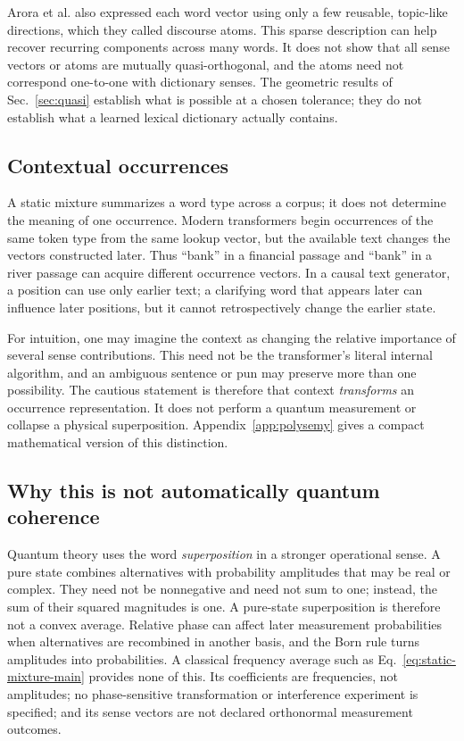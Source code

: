 \documentclass[
  aps,
  reprint,
  superscriptaddress,
  floatfix,
  nofootinbib,
  longbibliography
]{revtex4-2}
\begin{document}
Arora et al. also expressed each word vector using only a few reusable,
topic-like directions, which they called discourse atoms.  This sparse
description can help recover recurring components across many words.  It does
not show that all sense vectors or atoms are mutually quasi-orthogonal, and
the atoms need not correspond
one-to-one with dictionary senses.  The geometric results of
Sec.~\ref{sec:quasi} establish what is possible at a chosen tolerance; they do
not establish what a learned lexical dictionary actually contains.

\subsection{Contextual occurrences}

A static mixture summarizes a word type across a corpus; it does not determine
the meaning of one occurrence.  Modern transformers begin occurrences of the
same token type from the same lookup vector, but the available text changes
the vectors constructed later.  Thus ``bank'' in a financial passage and
``bank'' in a river passage can acquire different occurrence vectors.  In a
causal text generator, a position can use only earlier text; a clarifying word
that appears later can influence later positions, but it cannot retrospectively
change the earlier state.

For intuition, one may imagine the context as changing the relative importance
of several sense contributions.  This need not be the transformer's literal
internal algorithm, and an ambiguous sentence or pun may preserve more than
one possibility.  The cautious statement is therefore that context
\emph{transforms} an occurrence representation.  It does not perform a quantum
measurement or collapse a physical superposition.  Appendix~\ref{app:polysemy}
gives a compact mathematical version of this distinction.

\subsection{Why this is not automatically quantum coherence}

Quantum theory uses the word \emph{superposition} in a stronger operational
sense.  A pure state combines alternatives with probability amplitudes that
may be real or complex.  They need not be nonnegative and need not sum to one;
instead, the sum of their squared magnitudes is one.  A pure-state
superposition is therefore not a convex average.  Relative phase can affect
later measurement probabilities when alternatives
are recombined in another basis, and the Born rule turns amplitudes into
probabilities.  A classical frequency average such as
Eq.~\eqref{eq:static-mixture-main} provides none of this.  Its coefficients are
frequencies, not amplitudes; no phase-sensitive transformation or interference
experiment is specified; and its sense vectors are not declared orthonormal
measurement outcomes.
\end{document}
